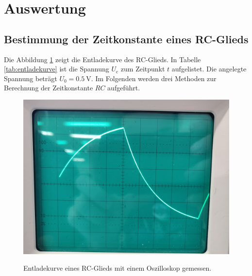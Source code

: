 \section{Auswertung}
\label{sec:Auswertung}

\subsection{Bestimmung der Zeitkonstante eines RC-Glieds}
Die Abbildung \ref{fig:entladekurve} zeigt die Entladekurve des RC-Glieds.
In Tabelle \ref{tab:entladekurve} ist die Spannung $U_\text{c}$ zum Zeitpunkt $t$ aufgelistet.
Die angelegte Spannung beträgt $U_0 = \SI{0.5}{\volt}$. Im Folgenden werden drei Methoden
zur Berechnung der Zeitkonstante $RC$ aufgeführt.
\begin{figure}
    \centering
    \includegraphics[width=\textwidth]{content/data/entlade.jpg}
    \label{fig:entladekurve}
    \caption{Entladekurve eines RC-Glieds mit einem Oszilloskop gemessen.}
\end{figure}
